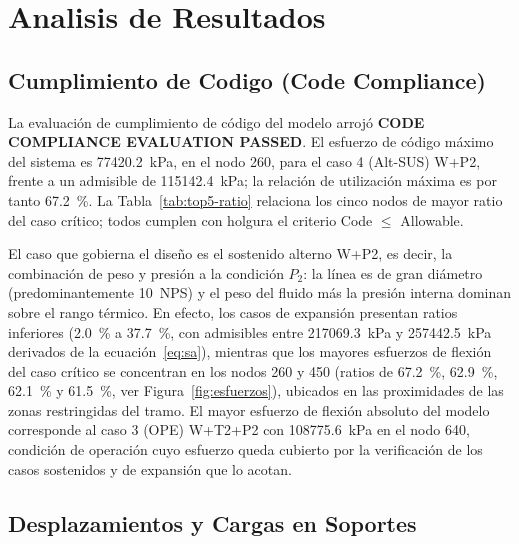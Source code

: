 \section{Analisis de Resultados}
\label{sec:analisis}

\subsection{Cumplimiento de Codigo (Code Compliance)}

La evaluaci\'{o}n de cumplimiento de c\'{o}digo del modelo arroj\'{o}
\textbf{CODE COMPLIANCE EVALUATION PASSED}. El esfuerzo de c\'{o}digo
m\'{a}ximo del sistema es \num{77420.2}~\si{kPa}, en el nodo 260, para el caso
4 (Alt-SUS) W+P2, frente a un admisible de \num{115142.4}~\si{kPa}; la
relaci\'{o}n de utilizaci\'{o}n m\'{a}xima es por tanto 67.2~\%. La
Tabla~\ref{tab:top5-ratio} relaciona los cinco nodos de mayor ratio del caso
cr\'{i}tico; todos cumplen con holgura el criterio Code $\leq$ Allowable.



El caso que gobierna el dise\~{n}o es el sostenido alterno W+P2, es decir, la
combinaci\'{o}n de peso y presi\'{o}n a la condici\'{o}n $P_2$: la l\'{i}nea es
de gran di\'{a}metro (predominantemente 10~NPS) y el peso del fluido m\'{a}s la
presi\'{o}n interna dominan sobre el rango t\'{e}rmico. En efecto, los casos de
expansi\'{o}n presentan ratios inferiores (2.0~\% a 37.7~\%, con admisibles
entre \num{217069.3}~\si{kPa} y \num{257442.5}~\si{kPa} derivados de la
ecuaci\'{o}n~\eqref{eq:sa}), mientras que los mayores esfuerzos de flexi\'{o}n
del caso cr\'{i}tico se concentran en los nodos 260 y 450 (ratios de 67.2~\%,
62.9~\%, 62.1~\% y 61.5~\%, ver Figura~\ref{fig:esfuerzos}), ubicados en las
proximidades de las zonas restringidas del tramo. El mayor esfuerzo de flexi\'{o}n absoluto del
modelo corresponde al caso 3 (OPE) W+T2+P2 con \num{108775.6}~\si{kPa} en el
nodo 640, condici\'{o}n de operaci\'{o}n cuyo esfuerzo queda cubierto por la
verificaci\'{o}n de los casos sostenidos y de expansi\'{o}n que lo acotan.

\subsection{Desplazamientos y Cargas en Soportes}

